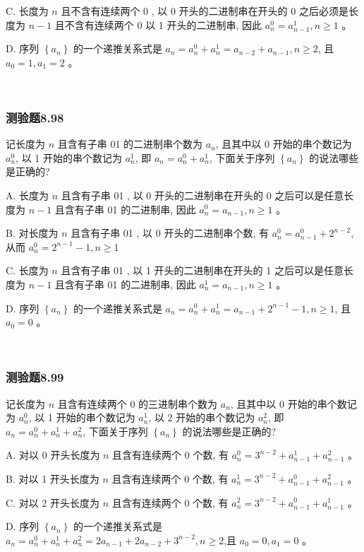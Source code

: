 \documentclass[UTF8, heading=true]{ctexart}
\begin{document}
C. 长度为 $n$ 且不含有连续两个 0 , 以 0 开头的二进制串在开头的 0 之后必须是长度为 $n-1$ 且不含有连续两个 0 以 1 开头的二进制串, 因此 $a_n^0=a_{n-1}^1, n \geq 1$ 。

D. 序列 $\left\{a_n\right\}$ 的一个递推关系式是 $a_n=a_n^0+a_n^1=a_{n-2}+a_{n-1}, n \geq 2$, 且 $a_0=1, a_1=2$ 。

\textcolor{white}{答案：CD}

\subsubsection{测验题8.98}

记长度为 $n$ 且含有子串 01 的二进制串个数为 $a_n$, 且其中以 0 开始的串个数记为 $a_n^0$, 以 1 开始的串个数记为 $a_n^1$, 即 $a_n=a_n^0+a_n^1$, 下面关于序列 $\left\{a_n\right\}$ 的说法哪些是正确的?

A. 
长度为 $n$ 且含有子串 01 , 以 0 开头的二进制串在开头的 0 之后可以是任意长度为 $n-1$ 且含有子串 01 的二进制串, 因此 $a_n^0=a_{n-1}, n \geq 1$ 。

B. 
对长度为 $n$ 且含有子串 01 , 以 0 开头的二进制串个数, 有 $a_n^0=a_{n-1}^0+2^{n-2}$, 从而 $a_n^0=2^{n-1}-1, n \geq 1$

C. 
长度为 $n$ 且含有子串 01 , 以 1 开头的二进制串在开头的 1 之后可以是任意长度为 $n-1$ 且含有子串 01 的二进制串, 因此 $a_n^1=a_{n-1}, n \geq 1$ 。

D. 
序列 $\left\{a_n\right\}$ 的一个递推关系式是 $a_n=a_n^0+a_n^1=a_{n-1}+2^{n-1}-1, n \geq 1$, 且 $a_0=0$ 。

\textcolor{white}{答案：BCD}


\subsubsection{测验题8.99}

记长度为 $n$ 且含有连续两个 0 的三进制串个数为 $a_n$, 且其中以 0 开始的串个数记为 $a_n^0$, 以 1 开始的串个数记为 $a_n^1$, 以 2 开始的串个数记为 $a_n^2$, 即 $a_n=a_n^0+a_n^1+a_n^2$, 下面关于序列 $\left\{a_n\right\}$ 的说法哪些是正确的?

A. 对以 0 开头长度为 $n$ 且含有连续两个 0 个数, 有 $a_n^0=3^{n-2}+a_{n-1}^1+a_{n-1}^2$ 。

B. 对以 1 开头长度为 $n$ 且含有连续两个 0 个数, 有 $a_n^1=3^{n-2}+a_{n-1}^0+a_{n-1}^2$ 。

C. 对以 2 开头长度为 $n$ 且含有连续两个 0 个数, 有 $a_n^2=3^{n-2}+a_{n-1}^0+a_{n-1}^1$ 。

D. 序列 $\left\{a_n\right\}$ 的一个递推关系式是 $a_n=a_n^0+a_n^1+a_n^2=2 a_{n-1}+2 a_{n-2}+3^{n-2}, n \geq 2$,且 $a_0=0, a_1=0$ 。
\end{document}
